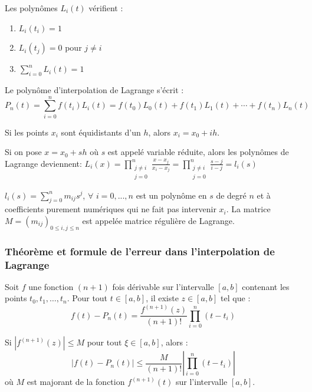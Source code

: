 \begin{proposition}
	Les polynômes $L_i(t)$ vérifient :
	\begin{enumerate}
		\item $L_i(t_i) = 1$
		\item $L_i(t_j) = 0$ pour $j \neq i$
		\item $\displaystyle\sum_{i=0}^n L_i(t) = 1$
	\end{enumerate}
\end{proposition}

\begin{theoreme}
	Le polynôme d'interpolation de Lagrange s'écrit :
	$$P_n(t) = \displaystyle\sum_{i=0}^n f(t_i) L_i(t) = f(t_0) L_0(t) + f(t_1) L_1(t) + \cdots + f(t_n) L_n(t)$$
\end{theoreme}

\begin{definition}
	Si les points $x_{i}$ sont équidistants d'un $h$, alors $x_{i}=x_{0}+ih$.
	
	Si on pose $x=x_{0}+sh$ où $s$ est appelé variable réduite, alors les polynômes de Lagrange deviennent:
	$L_i(x) = \displaystyle\prod_{\substack{j \neq i \\j=0 }}^{n} \frac{x - x_j}{x_i - x_j}= \displaystyle\prod_{\substack{j \neq i \\j=0 }}^{n} \frac{s-j}{i -j}= l_i(s)$
	
	$l_i(s)= \displaystyle\sum_{j=0}^{n} m_{ij}s^{j}$, $\forall$ $i=0,...,n$ est un polynôme en $s$ de degré $n$ et à coefficients purement numériques qui ne fait pas intervenir $x_{i}$. La matrice $M=(m_{ij})_{0\leq i,j\leq n}$ est appelée matrice régulière de Lagrange.
\end{definition}
\subsubsection{Théorème et formule de l'erreur dans l'interpolation de Lagrange}

\begin{theoreme}
	Soit $f$ une fonction $(n+1)$ fois dérivable sur l'intervalle $[a,b]$ contenant les points $t_0, t_1, \ldots, t_n$. Pour tout $t \in [a,b]$, il existe $z \in [a,b]$ tel que :
	$$f(t) - P_n(t) = \frac{f^{(n+1)}(z)}{(n+1)!} \displaystyle\prod_{i=0}^n (t - t_i)$$
\end{theoreme}

Si $|f^{(n+1)}(z)| \leq M$ pour tout $\xi \in [a,b]$, alors :
$$|f(t) - P_n(t)| \leq \frac{M}{(n+1)!} \left|\displaystyle\prod_{i=0}^n (t - t_i)\right|$$
 où $ M $ est majorant de la fonction $ f^{(n+1)}(t) $ sur l’intervalle $ [a, b] $.
 
